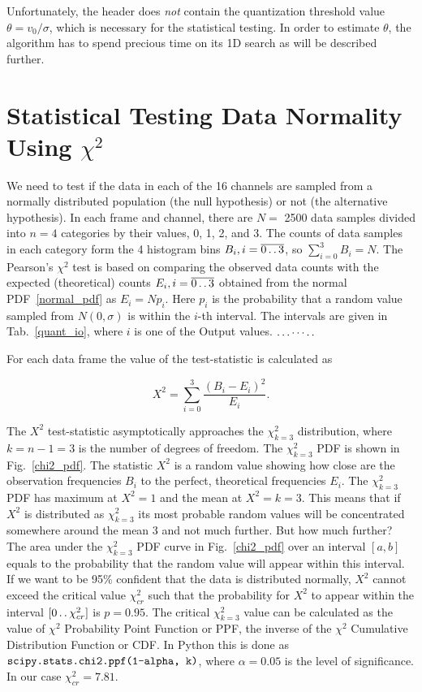 \documentclass[letterpaper,twoside,12pt]{article}
\newcommand{\twodots}{\mathinner {\ldotp \ldotp}}
\begin{document}
Unfortunately, the header does \emph{not} contain the quantization threshold value $\theta = v_0/\sigma$, which is necessary for the statistical testing. In order to estimate $\theta$, the algorithm has to spend precious time on its 1D search as will be described further. 




\section{Statistical Testing Data Normality Using $\chi^2$}

We need to test if the data in each of the 16 channels are sampled from a normally distributed population (the null hypothesis) or not (the alternative hypothesis). In each frame and channel, there are $N=$ 2500 data samples divided into $n=4$ categories by their values, 0, 1, 2, and 3. The counts of data samples in each category form the 4 histogram bins $B_i, i=\overline{0 \twodots 3}$, so $\sum_{i=0}^3 B_i = N$. The Pearson's $\chi^2$ test is based on comparing the observed data counts with the expected (theoretical) counts $E_i, i=\overline{0 \twodots 3}$ obtained from the normal PDF~\eqref{normal_pdf} as $E_i = Np_i$. Here $p_i$ is the probability that a random value sampled from $N(0,\sigma)$ is within the $i$-th interval. The intervals are given in Tab.~\ref{quant_io}, where $i$ is one of the Output values. $\ldots\cdots\ldotp\ldotp$

For each data frame the value of the test-statistic is calculated as

\begin{equation}
  \label{x2_calc}
  X^2 = \sum_{i=0}^3 \frac{(B_i - E_i)^2}{E_i}.
\end{equation}


The $X^2$ test-statistic asymptotically approaches the $\chi^2_{k=3}$ distribution, where $k = n - 1 = 3$ is the number of degrees of freedom. The $\chi^2_{k=3}$ PDF is shown in Fig.~\ref{chi2_pdf}. The statistic $X^2$ is a random value showing how close are the observation frequencies $B_i$ to the perfect, theoretical frequencies $E_i$. The $\chi^2_{k=3}$ PDF has maximum at $X^2=1$ and the mean at $X^2=k=3$. This means that if $X^2$ is distributed as $\chi^2_{k=3}$ its most probable random values will be concentrated somewhere around the mean 3 and not much further. But how much further? The area under the $\chi^2_{k=3}$ PDF curve in Fig.~\ref{chi2_pdf} over an interval $[a,b]$ equals to the probability that the random value will appear within this interval. If we want to be 95\% confident that the data is distributed normally, $X^2$ cannot exceed the critical value $\chi^2_{cr}$ such that the probability for $X^2$ to appear within the interval $[0 \twodots \chi^2_{cr}]$ is $p=0.95$. The critical $\chi^2_{k=3}$ value can be calculated as the value of $\chi^2$ Probability Point Function or PPF, the inverse of the $\chi^2$ Cumulative Distribution Function or CDF. In Python this is done as $\verb@scipy.stats.chi2.ppf(1-alpha, k)@$, where $\alpha = 0.05$ is the level of significance. In our case $\chi^2_{cr} = 7.81$. 
\end{document}
